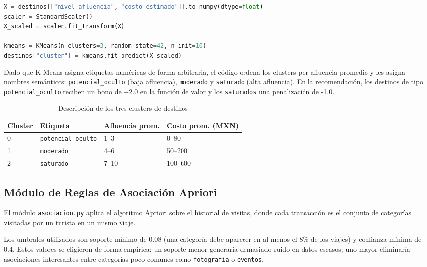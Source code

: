 \documentclass[12pt,letterpaper]{report}
\begin{document}
\begin{lstlisting}[language=Python, caption=Entrenamiento del modelo K-Means]
X = destinos[["nivel_afluencia", "costo_estimado"]].to_numpy(dtype=float)
scaler = StandardScaler()
X_scaled = scaler.fit_transform(X)

kmeans = KMeans(n_clusters=3, random_state=42, n_init=10)
destinos["cluster"] = kmeans.fit_predict(X_scaled)
\end{lstlisting}

Dado que K-Means asigna etiquetas numéricas de forma arbitraria, el código ordena los clusters
por afluencia promedio y les asigna nombres semánticos: \texttt{potencial\_oculto} (baja
afluencia), \texttt{moderado} y \texttt{saturado} (alta afluencia). En la recomendación, los
destinos de tipo \texttt{potencial\_oculto} reciben un bono de +2.0 en la función de valor y
los \texttt{saturados} una penalización de -1.0.

\begin{table}[H]
\centering
\caption{Descripción de los tres clusters de destinos}
\label{tab:clusters}
\begin{tabular}{llll}
\toprule
\textbf{Cluster} & \textbf{Etiqueta} & \textbf{Afluencia prom.} & \textbf{Costo prom. (MXN)} \\
\midrule
0 & \texttt{potencial\_oculto} & 1–3  & 0–80   \\
1 & \texttt{moderado}          & 4–6  & 50–200 \\
2 & \texttt{saturado}          & 7–10 & 100–600 \\
\bottomrule
\end{tabular}
\end{table}

\subsection{Módulo de Reglas de Asociación Apriori}

El módulo \texttt{asociacion.py} aplica el algoritmo Apriori sobre el historial de visitas,
donde cada transacción es el conjunto de categorías visitadas por un turista en un mismo viaje.

Los umbrales utilizados son soporte mínimo de 0.08 (una categoría debe aparecer en al menos
el 8\% de los viajes) y confianza mínima de 0.4. Estos valores se eligieron de forma empírica:
un soporte menor generaría demasiado ruido en datos escasos; uno mayor eliminaría asociaciones
interesantes entre categorías poco comunes como \texttt{fotografia} o \texttt{eventos}.
\end{document}

